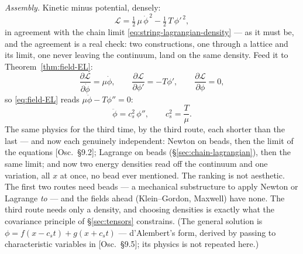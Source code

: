 \documentclass[11pt]{article}
\theoremstyle{plain}
\theoremstyle{definition}
\theoremstyle{remark}
\newcommand{\pd}[2]{\frac{\partial #1}{\partial #2}}
\begin{document}
\emph{Assembly.} Kinetic minus potential, densely:
\begin{equation}
  \mathcal L
  = \tfrac12\,\mu\,\dot\phi^{\,2}
  - \tfrac12\,T\,\phi'^{\,2} ,
\end{equation}
in agreement with the chain limit
\eqref{eq:string-lagrangian-density} --- as it must be, and the
agreement is a real check: two constructions, one through a lattice
and its limit, one never leaving the continuum, land on the same
density. Feed it to Theorem~\ref{thm:field-EL}:
\begin{equation}
  \pd{\mathcal L}{\dot\phi} = \mu\dot\phi,
  \qquad
  \pd{\mathcal L}{\phi'} = -T\phi',
  \qquad
  \pd{\mathcal L}{\phi} = 0,
\end{equation}
so \eqref{eq:field-EL} reads $\mu\ddot\phi - T\phi'' = 0$:
\begin{equation}
  \boxed{\;
  \ddot\phi = c_s^2\,\phi'',
  \qquad c_s^2 = \frac{T}{\mu}.
  \;}
\end{equation}
The same physics for the third time, by the third route, each shorter
than the last --- and now each genuinely independent: Newton on beads,
then the limit of the equations [Osc.\ \S9.2]; Lagrange on beads
(\S\ref{sec:chain-lagrangian}), then the same limit; and now two
energy densities read off the continuum and one variation, all $x$ at
once, no bead ever mentioned. The ranking is not aesthetic. The first
two routes need beads
--- a mechanical substructure to apply Newton or Lagrange \emph{to}
--- and the fields ahead (Klein--Gordon, Maxwell) have none. The third
route needs only a density, and choosing densities is exactly what
the covariance principle of \S\ref{sec:tensors} constrains.
(The general solution is $\phi = f(x - c_s t) + g(x + c_s t)$ ---
d'Alembert's form, derived by passing to characteristic variables in
[Osc.\ \S9.5]; its physics is not repeated here.)
\end{document}
